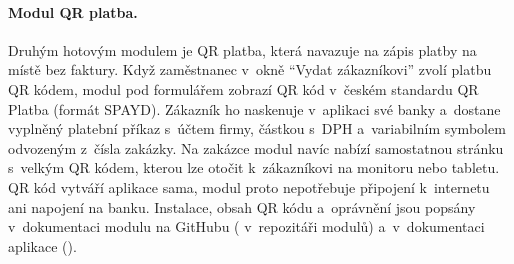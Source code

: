 \paragraph{Modul QR platba.} Druhým hotovým modulem je QR platba, která navazuje na zápis platby na místě bez faktury. Když zaměstnanec v~okně \enquote{Vydat zákazníkovi} zvolí platbu QR kódem, modul pod formulářem zobrazí QR kód v~českém standardu QR Platba (formát SPAYD). Zákazník ho naskenuje v~aplikaci své banky a~dostane vyplněný platební příkaz s~účtem firmy, částkou s~DPH a~variabilním symbolem odvozeným z~čísla zakázky. Na zakázce modul navíc nabízí samostatnou stránku s~velkým QR kódem, kterou lze otočit k~zákazníkovi na monitoru nebo tabletu. QR kód vytváří aplikace sama, modul proto nepotřebuje připojení k~internetu ani napojení na banku. Instalace, obsah QR kódu a~oprávnění jsou popsány v~dokumentaci modulu na GitHubu ( v~repozitáři modulů) a~v~dokumentaci aplikace ().

